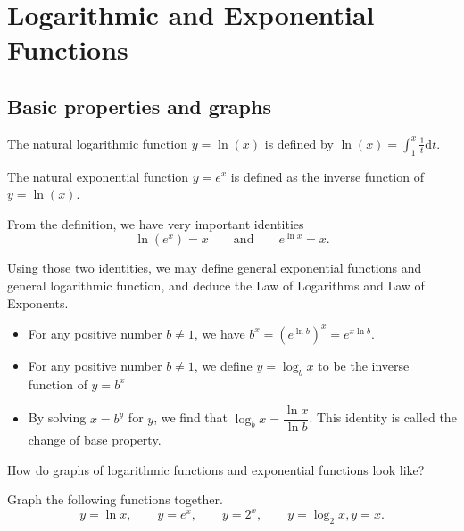 \documentclass[
  en,11pt,simple]{elegantbook}
\renewenvironment{example}[1][]{
  \refstepcounter{exam}
  \par\noindent\textbf{\color{main}{\examplename} \theexam #1}
  \rmfamily
}{
  \par\ignorespacesafterend
}
\begin{document}
\hypertarget{logarithmic-and-exponential-functions}{%
\section{Logarithmic and Exponential Functions}\label{logarithmic-and-exponential-functions}}

\hypertarget{basic-properties-and-graphs}{%
\subsection{Basic properties and graphs}\label{basic-properties-and-graphs}}

The natural logarithmic function \(y=\ln(x)\) is defined by \(\ln(x)=\int_1^x\frac{1}{t}\mathrm{d} t\).

The natural exponential function \(y=e^x\) is defined as the inverse function of \(y=\ln(x)\).

From the definition, we have very important identities
\[
\ln(e^x)=x\qquad \text{and}\qquad e^{\ln x}=x.
\]

Using those two identities, we may define general exponential functions and general logarithmic function, and deduce the Law of Logarithms and Law of Exponents.

\begin{itemize}
\item
  For any positive number \(b\ne 1\), we have \(b^x=(e^{\ln b})^x=e^{x\ln b}\).
\item
  For any positive number \(b\ne 1\), we define \(y=\log_bx\) to be the inverse function of \(y=b^x\)
\item
  By solving \(x=b^y\) for \(y\), we find that \(\log_bx=\dfrac{\ln x}{\ln b}\). This identity is called the change of base property.
\end{itemize}

How do graphs of logarithmic functions and exponential functions look like?

\begin{example}

Graph the following functions together.
\[
y=\ln x, \qquad y=e^x, \qquad y=2^x, \qquad y=\log_2x, y=x.
\]
\end{example}
\end{document}
